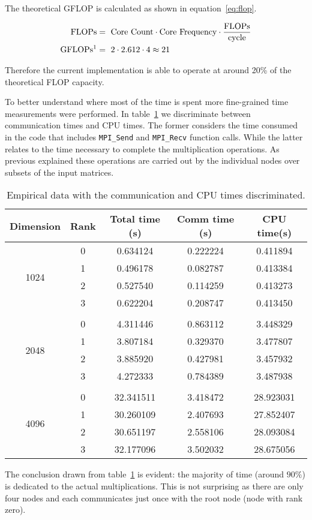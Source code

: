 The theoretical GFLOP is calculated as shown in equation~\ref{eq:flop}.

\begin{align}
\text{FLOPs}   &=~\text{Core Count} \cdot \text{Core Frequency} \cdot \frac{\text{FLOPs}}{\text{cycle}} \\
\text{GFLOPs\footnotemark} &=~2 \cdot 2.612 \cdot 4 \approx 21
\label{eq:flop}
\end{align}

Therefore the current implementation is able to operate at around 20\% of the theoretical FLOP capacity.


To better understand where most of the time is spent more fine-grained time measurements were performed.
In table~\ref{tbl:timing} we discriminate between communication times and CPU times.
The former considers the time consumed in the code that includes \texttt{MPI\_Send} and \texttt{MPI\_Recv} function calls.
While the latter relates to the time necessary to complete the multiplication operations.
As previous explained these operations are carried out by the individual nodes over subsets of the input matrices.

\begin{table}[H]
\centering
\begin{tabular}{*{5}{c}}
 \toprule
Dimension & Rank  &  Total time (\si{s})  &  Comm time  (\si{s})  &  CPU time(\si{s})  \\ \midrule 
\multirow{4}{*}{1024}
&  0  &  0.634124  &  0.222224  &  0.411894   \\
&  1  &  0.496178  &  0.082787  &  0.413384   \\
&  2  &  0.527540  &  0.114259  &  0.413273   \\
&  3  &  0.622204  &  0.208747  &  0.413450   \\\\
\multirow{4}{*}{2048}
&  0  &  4.311446  &  0.863112  &  3.448329   \\
&  1  &  3.807184  &  0.329370  &  3.477807   \\
&  2  &  3.885920  &  0.427981  &  3.457932   \\
&  3  &  4.272333  &  0.784389  &  3.487938   \\\\
\multirow{4}{*}{4096}
&  0  &  32.341511  &  3.418472  &  28.923031   \\
&  1  &  30.260109  &  2.407693  &  27.852407   \\
&  2  &  30.651197  &  2.558106  &  28.093084   \\
&  3  &  32.177096  &  3.502032  &  28.675056   \\

\bottomrule
\end{tabular}
\caption{Empirical data with the communication and CPU times discriminated.}
\label{tbl:timing}
\end{table}


The conclusion drawn from table~\ref{tbl:timing} is evident: the majority of time (around $90\%$) is dedicated to the actual multiplications.
This is not surprising as there are only four nodes and each communicates just once with the root node (\ie node with rank zero).
        





